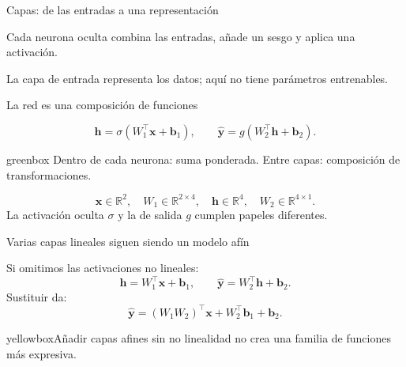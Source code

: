 \documentclass[10pt,aspectratio=169,xcolor={dvipsnames}]{beamer}
\newenvironment{caja}[1][lgraybox]{\begin{beamercolorbox}[sep=0.7em,wd=\linewidth]{#1}}{\end{beamercolorbox}}
\newcommand{\R}{\mathbb{R}}
\begin{document}
\begin{frame}{Capas: de las entradas a una representación}

\centering
{}\par\bigskip\raggedright
Cada neurona oculta combina las entradas, añade un sesgo y aplica una activación.
\par\medskip La capa de entrada representa los datos; aquí no tiene parámetros entrenables.
\end{frame}

\begin{frame}{La red es una composición de funciones}

\[\bm h=\sigma(W_1^\top\bm x+\bm b_1),\qquad
\hat{\bm y}=g(W_2^\top\bm h+\bm b_2).\]
\begin{caja}[greenbox]
Dentro de cada neurona: suma ponderada. Entre capas: composición de transformaciones.
\end{caja}
\[\bm x\in\R^2,\quad W_1\in\R^{2\times4},\quad
\bm h\in\R^4,\quad W_2\in\R^{4\times1}.\]
La activación oculta $\sigma$ y la de salida $g$ cumplen papeles diferentes.
\note{}
\end{frame}

\begin{frame}{Varias capas lineales siguen siendo un modelo afín}

Si omitimos las activaciones no lineales:
\[\bm h=W_1^\top\bm x+\bm b_1,\qquad
\hat{\bm y}=W_2^\top\bm h+\bm b_2.\]
Sustituir da:
\[\hat{\bm y}=(W_1W_2)^\top\bm x+W_2^\top\bm b_1+\bm b_2.\]
\begin{caja}[yellowbox]Añadir capas afines sin no linealidad no crea una familia de funciones más expresiva.\end{caja}
\note{}
\end{frame}
\end{document}
